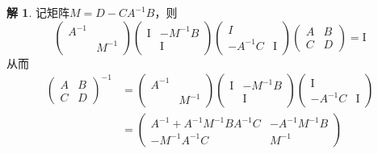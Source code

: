 \documentclass[10pt]{article}
\theoremstyle{definition}
\newtheorem*{solution}{解}
\theoremstyle{definition}
\begin{document}
\begin{enumerate}
        \begin{solution}
            记矩阵$M=D-CA^{-1}B$，则
            \begin{equation*}
                \begin{pmatrix}
                    A^{-1} & \\
                           & M^{-1}
                \end{pmatrix}
                \begin{pmatrix}
                    \mathrm{I} & -M^{-1}B \\
                               & \mathrm{I}
                \end{pmatrix}
                \begin{pmatrix}
                    I & \\
                    -A^{-1}C & \mathrm{I}
                \end{pmatrix}
                \begin{pmatrix}
                    A & B \\
                    C & D
                \end{pmatrix}=\mathrm{I}
            \end{equation*}
            从而
            \begin{equation*}
                \begin{aligned}
                    \begin{pmatrix}
                        A & B \\
                        C & D
                    \end{pmatrix}^{-1} & =
                    \begin{pmatrix}
                        A^{-1} & \\
                               & M^{-1}
                    \end{pmatrix}
                    \begin{pmatrix}
                        \mathrm{I} & -M^{-1}B \\
                                   & \mathrm{I}
                    \end{pmatrix}
                    \begin{pmatrix}
                        \mathrm{I} & \\
                        -A^{-1}C & \mathrm{I}
                    \end{pmatrix} \\ & =
                    \begin{pmatrix}
                        A^{-1}+A^{-1}M^{-1}BA^{-1}C & -A^{-1}M^{-1}B \\
                        -M^{-1}A^{-1}C & M^{-1}
                    \end{pmatrix}
                \end{aligned}
            \end{equation*}
        \end{solution}


\end{enumerate}
\end{document}
